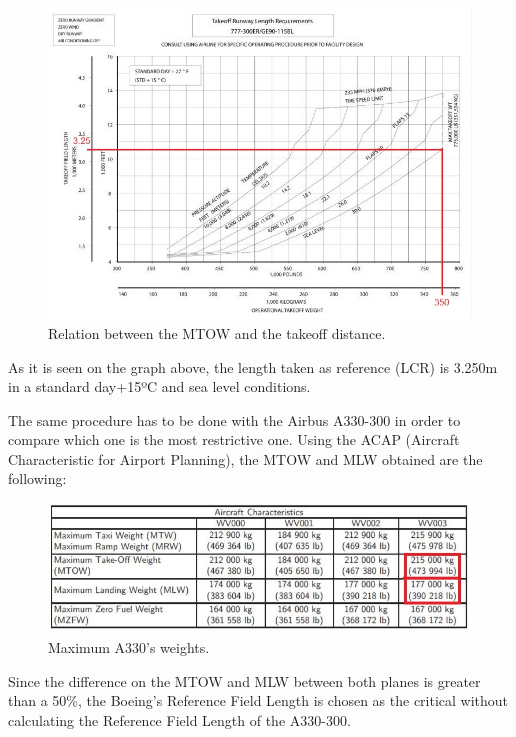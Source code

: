 			\begin{figure}[H]
				\centering
				\includegraphics[clip, trim=0cm 0cm 0cm 0cm, width=1\textwidth]{./images/B777/payload-takeoffdistance}
				\caption{Relation between the MTOW and the takeoff distance.} %
				\label{} %
			\end{figure}
			
			As it is seen on the graph above, the length taken as reference (LCR) is 3.250m in a standard day+15ºC and sea level conditions. 
			
			The same procedure has to be done with the Airbus A330-300 in order to compare which one is the most restrictive one. Using the ACAP (Aircraft Characteristic for Airport Planning), the MTOW and MLW obtained are the following:
			
			\begin{figure}[H]
				\centering
				\includegraphics[clip, trim=0cm 0cm 0cm 0cm, width=1\textwidth]{./images/A330/A330}
				\caption{Maximum A330's weights.} %
				\label{} %
			\end{figure}
			
			Since the difference on the MTOW and MLW between both planes is greater than a 50\%, the Boeing’s Reference Field Length is chosen as the critical without calculating the Reference Field Length of the A330-300.
			
